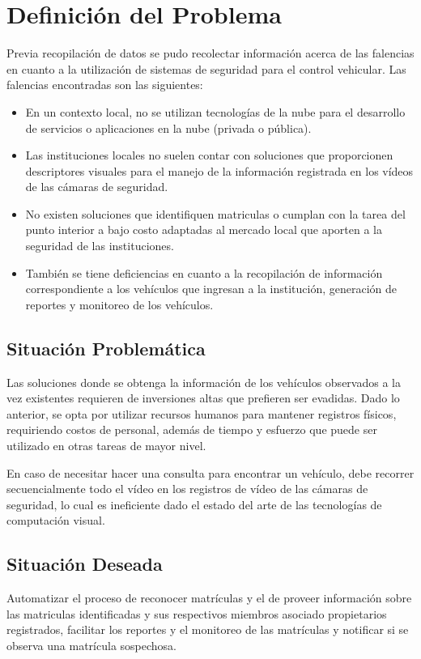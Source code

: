 \section{Definición del Problema}
Previa recopilación de datos se pudo recolectar información acerca de las falencias en cuanto a la utilización de sistemas de seguridad para el control vehicular. Las falencias encontradas son las siguientes:
\begin{itemize}
  \item En un contexto local, no se utilizan tecnologías de la nube para el desarrollo de servicios o aplicaciones en la nube (privada o pública). 
  \item Las instituciones locales no suelen contar con soluciones que proporcionen descriptores visuales para el manejo de la información registrada en los vídeos de las cámaras de seguridad. 
  \item No existen soluciones que identifiquen matriculas o cumplan con la tarea del punto interior a bajo costo adaptadas al mercado local que aporten a la seguridad de las instituciones.
  \item También se tiene deficiencias en cuanto a la recopilación de información correspondiente a los vehículos que ingresan a la institución, generación de reportes y monitoreo de los vehículos.
\end{itemize}
\color{mypink2}

    \subsection{Situación Problemática}
    Las soluciones donde se obtenga la información de los vehículos observados a la vez existentes requieren de inversiones altas que prefieren ser evadidas. Dado lo anterior, se opta por utilizar recursos humanos para mantener registros físicos, requiriendo costos de personal, además de tiempo y esfuerzo que puede ser utilizado en otras tareas de mayor nivel.
    
    En caso de necesitar hacer una consulta para encontrar un vehículo, debe recorrer secuencialmente todo el vídeo en los registros de vídeo de las cámaras de seguridad, lo cual es ineficiente dado el estado del arte de las tecnologías de computación visual.
    \subsection{Situación Deseada}
    Automatizar el proceso de reconocer matrículas y el de proveer información sobre las matriculas identificadas y sus respectivos miembros asociado propietarios registrados, facilitar los reportes y el monitoreo de las matrículas y notificar si se observa una matrícula sospechosa.

